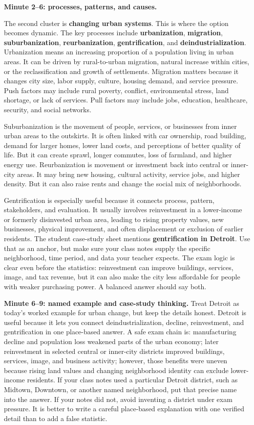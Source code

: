 \documentclass[11pt,a4paper]{article}
\newcommand{\term}[1]{\textcolor{HeadingBlue}{\textbf{#1}}}
\begin{document}
\textbf{Minute 2--6: processes, patterns, and causes.}

The second cluster is \term{changing urban systems}. This is where the option
becomes dynamic. The key processes include \term{urbanization}, \term{migration},
\term{suburbanization}, \term{reurbanization}, \term{gentrification}, and
\term{deindustrialization}. Urbanization means an increasing proportion of a
population living in urban areas. It can be driven by rural-to-urban migration,
natural increase within cities, or the reclassification and growth of
settlements. Migration matters because it changes city size, labor supply,
culture, housing demand, and service pressure. Push factors may include rural
poverty, conflict, environmental stress, land shortage, or lack of services.
Pull factors may include jobs, education, healthcare, security, and social
networks.

Suburbanization is the movement of people, services, or businesses from inner
urban areas to the outskirts. It is often linked with car ownership, road
building, demand for larger homes, lower land costs, and perceptions of better
quality of life. But it can create sprawl, longer commutes, loss of farmland,
and higher energy use. Reurbanization is movement or investment back into
central or inner-city areas. It may bring new housing, cultural activity,
service jobs, and higher density. But it can also raise rents and change the
social mix of neighborhoods.

Gentrification is especially useful because it connects process, pattern,
stakeholders, and evaluation. It usually involves reinvestment in a lower-income
or formerly disinvested urban area, leading to rising property values, new
businesses, physical improvement, and often displacement or exclusion of earlier
residents. The student case-study sheet mentions \term{gentrification in
Detroit}. Use that as an anchor, but make sure your class notes supply the
specific neighborhood, time period, and data your teacher expects. The exam
logic is clear even before the statistics: reinvestment can improve buildings,
services, image, and tax revenue, but it can also make the city less affordable
for people with weaker purchasing power. A balanced answer should say both.

\textbf{Minute 6--9: named example and case-study thinking.}
Treat Detroit as today's worked example for urban change, but keep the details
honest. Detroit is useful because it lets you connect deindustrialization,
decline, reinvestment, and gentrification in one place-based answer. A safe
exam chain is: manufacturing decline and population loss weakened parts of the
urban economy; later reinvestment in selected central or inner-city districts
improved buildings, services, image, and business activity; however, those
benefits were uneven because rising land values and changing neighborhood
identity can exclude lower-income residents. If your class notes used a
particular Detroit district, such as Midtown, Downtown, or another named
neighborhood, put that precise name into the answer. If your notes did not,
avoid inventing a district under exam pressure. It is better to write a careful
place-based explanation with one verified detail than to add a false statistic.
\end{document}
